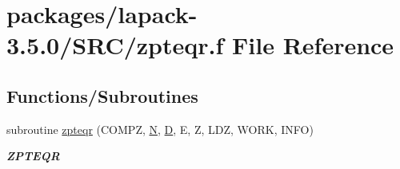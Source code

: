 \hypertarget{zpteqr_8f}{}\section{packages/lapack-\/3.5.0/\+S\+R\+C/zpteqr.f File Reference}
\label{zpteqr_8f}
\subsection*{Functions/\+Subroutines}
\begin{DoxyCompactItemize}
\item 
subroutine \hyperlink{group__complex16PTcomputational_ga08d07a22ba5f50a14d9caf644723b5c3}{zpteqr} (C\+O\+M\+P\+Z, \hyperlink{polmisc_8c_a0240ac851181b84ac374872dc5434ee4}{N}, \hyperlink{odrpack_8h_a7dae6ea403d00f3687f24a874e67d139}{D}, E, Z, L\+D\+Z, W\+O\+R\+K, I\+N\+F\+O)
\begin{DoxyCompactList}\small\item\em {\bfseries Z\+P\+T\+E\+Q\+R} \end{DoxyCompactList}\end{DoxyCompactItemize}
